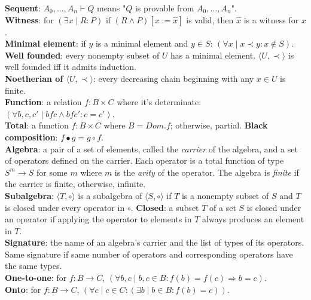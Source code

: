 \documentclass[10pt,landscape]{article}
\begin{document}
\begin{multicols}{3}
{\textbf{Sequent}: $A_0,\dots,A_n\vdash Q$ means "$Q$ is provable from $A_0, \dots, A_n$".\\
\textbf{Witness}: for $(\exists x\mid R:P)$ if $(R\land P)[x:=\hat{x}]$ is valid, then $\hat{x}$ is a witness for $x$.\\
\textbf{Minimal element}: if $y$ is a minimal element and $y\in S$: $(\forall x\mid x\prec y: x\not\in S)$.\\
\textbf{Well founded}: every nonempty subset of $U$ has a minimal element. $\langle U, \prec\rangle$ is well founded iff it admits induction.\\
\textbf{Noetherian of $\langle U,\prec\rangle$}: every decreasing chain beginning with any $x\in U$ is finite. \\
\textbf{Function}: a relation $f:B\times C$ where it's determinate: $(\forall b,c,c'\mid bfc \land bfc' : c=c')$.\\
\textbf{Total}: a function $f:B\times C$ where $B=Dom.f$; otherwise, partial.
\textbf{Black composition}: $f\bullet g = g\circ f$.\\
\textbf{Algebra}: a pair of a set of elements, called the \textit{carrier} of the algebra, and a set of operators defined on the carrier. Each operator is a total function of type $S^m\rightarrow S$ for some $m$ where $m$ is the \textit{arity} of the operator. The algebra is \textit{finite} if the carrier is finite, otherwise, infinite. \\
\textbf{Subalgebra}: $\langle T, \circ\rangle$ is a subalgebra of $\langle S,\circ\rangle$ if $T$ is a nonempty subset of $S$ and $T$ is closed under every operator in $\circ$. 
\textbf{Closed}: a subset $T$ of a set $S$ is closed under an operator if applying the operator to elements in $T$ always produces an element in $T$. \\
\textbf{Signature}: the name of an algebra's carrier and the list of types of its operators. Same signature if same number of operators and corresponding operators have the same types.\\
\textbf{One-to-one}: for $f:B\rightarrow C$, $(\forall b,c\mid b,c\in B: f(b)=f(c)\Rightarrow b=c)$.\\
\textbf{Onto}: for $f:B\rightarrow C$, $(\forall c\mid c\in C : (\exists b\mid b\in B : f(b)=c))$.\\
}
\end{multicols}
\end{document}
